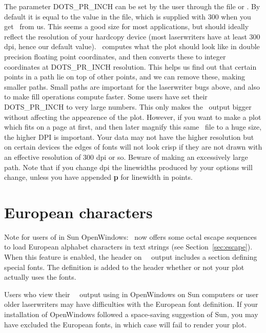 The parameter DOTS\_PR\_INCH can be set by the user through
the  file or .  By default
it is equal to the value in the 
file, which is supplied with 300 when you get \GMT\ from us.
This seems a good size for most applications, but should ideally
reflect the resolution of your hardcopy device (most laserwriters
have at least 300 dpi, hence our default value).  \GMT\ computes what the
plot should look like in double precision floating point
coordinates, and then converts these to integer coordinates at
DOTS\_PR\_INCH resolution.  This helps us find out that certain
points in a path lie on top of other points, and we can remove
these, making smaller paths.  Small paths are important for the
laserwriter bugs above, and also to make fill operations compute
faster.  Some users have set their DOTS\_PR\_INCH to very large
numbers.  This only makes the \PS\ output bigger
without affecting the appearence of the plot.  However, if you
want to make a plot which fits on a page at first, and then
later magnify this same \PS\ file to a huge size,
the higher DPI is important.  Your data may not have the higher
resolution but on certain devices the edges of fonts will not
look crisp if they are not drawn with an effective resolution
of 300 dpi or so.  Beware of making an excessively large path.
Note that if you change dpi the linewidths produced by your
 options will change, unless you have appended {\bf p}
for linewidth in points.

\section{European characters}
Note for users of  in Sun OpenWindows: \GMT\ now
offers some octal escape sequences to load European alphabet
characters in text strings (see Section~\ref{sec:escape}).  When
this feature is enabled, the header on \GMT\ \PS\ output includes
a section defining special fonts.  The definition is added to
the header whether or not your plot actually uses the fonts.

Users who view their \GMT\ \PS\ output using
 in OpenWindows on Sun computers or user older
laserwriters may have difficulties with the European font
definition.  If your installation of OpenWindows followed
a space-saving suggestion of Sun, you may have excluded the
European fonts, in which case  will fail
to render your plot.

